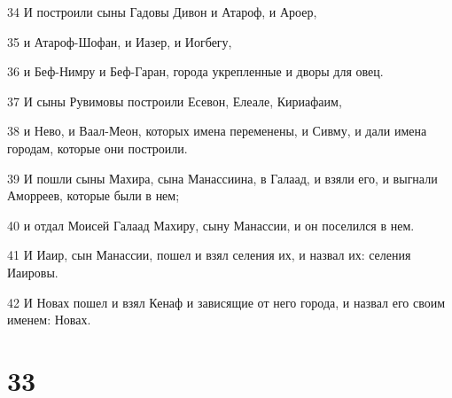 \par 34 И построили сыны Гадовы Дивон и Атароф, и Ароер,
\par 35 и Атароф-Шофан, и Иазер, и Иогбегу,
\par 36 и Беф-Нимру и Беф-Гаран, города укрепленные и дворы для овец.
\par 37 И сыны Рувимовы построили Есевон, Елеале, Кириафаим,
\par 38 и Нево, и Ваал-Меон, которых имена переменены, и Сивму, и дали имена городам, которые они построили.
\par 39 И пошли сыны Махира, сына Манассиина, в Галаад, и взяли его, и выгнали Аморреев, которые были в нем;
\par 40 и отдал Моисей Галаад Махиру, сыну Манассии, и он поселился в нем.
\par 41 И Иаир, сын Манассии, пошел и взял селения их, и назвал их: селения Иаировы.
\par 42 И Новах пошел и взял Кенаф и зависящие от него города, и назвал его своим именем: Новах.

\chapter{33}


